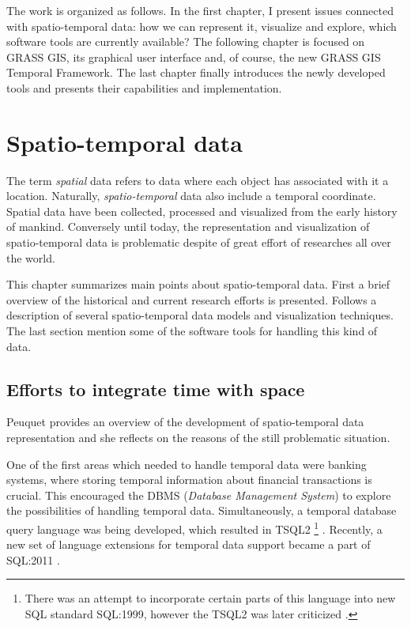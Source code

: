 \documentclass[a4paper,12pt,oneside]{book}
\newcommand{\tf}{Temporal Framework\xspace}
\begin{document}
The work is organized as follows. In the first chapter, I present issues connected with spatio-temporal data:
how we can represent it, visualize and explore, which software tools are currently available?
The following chapter is focused on GRASS GIS, its graphical user interface and, of course,
the new GRASS GIS \tf.
The last chapter finally introduces the newly developed tools and presents their capabilities and implementation.







\chapter{Spatio-temporal data}
\label{chap:stdata}
The term \emph{spatial} data refers to data where each object has associated with it a location.
Naturally, \emph{spatio-temporal} data also include a temporal coordinate.
Spatial data have been collected, processed and visualized from the early history of mankind.
Conversely until today, the representation and visualization of spatio-temporal data
is problematic despite of great effort of researches all over the world.

This chapter summarizes main points about spatio-temporal data.
First a brief overview of the historical and current research efforts is presented.
Follows a description of several spatio-temporal data models and visualization techniques.
The last section mention some of the software tools for handling this kind of data.


\section{Efforts to integrate time with space}
Peuquet \cite{peuquet2001} provides an overview of the development of spatio-temporal data representation
and she reflects on the reasons of the still problematic situation.

One of the first areas which needed to handle temporal data were banking systems,
where storing temporal information about financial transactions is crucial.
This encouraged the DBMS (\emph{Database Management System}) to explore the possibilities of handling
temporal data. Simultaneously, a temporal database query language was being developed,
which resulted in TSQL2%
\footnote{There was an attempt to incorporate certain parts of this language
into new SQL standard SQL:1999, however the TSQL2 was later criticized
\cite{darwen2005}.} \cite{snodgrass1995}.
Recently, a new set of language extensions for temporal data support became a part of
SQL:2011 \cite{kulkarni2012}.
\end{document}
